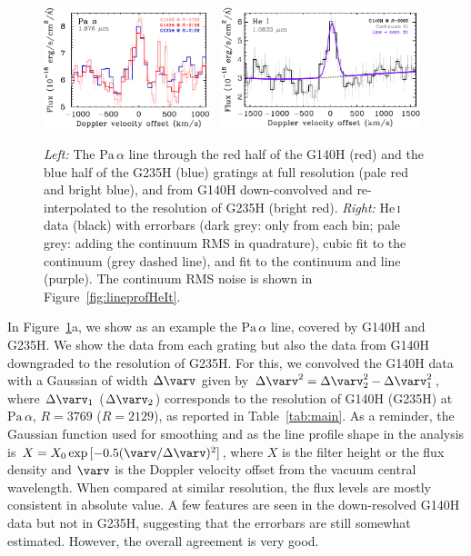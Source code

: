 \documentclass[twocolumn,twocolumnappendix]{aastex631}
\newcommand{\neuI}[1]{{\leavevmode{\boldmath\bfseries#1}}}
\renewcommand{\neuI}[1]{{\leavevmode#1}}
\def\Paa{\ensuremath{\mathrm{Pa}\,\alpha}\xspace}           %
\def\HeI{\ensuremath{\mathrm{He}}\,\textsc{i}\xspace}       %
\def\HeIt{\HeI}                     %
\def\Dv{\ensuremath{\Delta \varv}\xspace}
\begin{document}
\begin{figure}
 \centering
 \includegraphics[width=0.43\textwidth]{TWA27B_ULFLS_UeberlappPaa.pdf}~~\includegraphics[width=0.515\textwidth]{TWA27B_ULFLS_Vignette_HeIt.pdf}
\caption{%
\textit{Left:}
The \Paa line through the red half of the G140H (red) and the blue half of the G235H (blue) gratings at full resolution (pale red and bright blue), and from G140H down-convolved and re-interpolated to the resolution of G235H (bright red).
\textit{Right:}
\HeIt data (black) with errorbars (dark grey: only from each bin; pale grey: adding the continuum RMS in quadrature), cubic fit to the continuum (grey dashed line), and fit to the continuum and line (purple).
The continuum RMS noise is shown in Figure~\ref{fig:lineprofHeIt}.
%
}
\label{fig:Paa+HeIt}
\end{figure}



In Figure~\ref{fig:Paa+HeIt}a, we show as an example the \Paa line, covered by G140H and G235H.
We show the data from each grating but also the data from G140H %
downgraded to the resolution of G235H.
For this, we convolved the G140H data with a Gaussian of width \Dv given by $\Dv^2=\Dv_2^2-\Dv_1^2$,
where $\Dv_1$ ($\Dv_2$) corresponds to the resolution of G140H (G235H) at \Paa, $R=3769$ ($R=2129$), as reported in Table~\ref{tab:main}.
As a reminder, the Gaussian function used for smoothing and as the line profile shape in the analysis
is $X=X_0\exp{[-0.5(\varv/\Dv)^2]}$, where $X$ is the filter height or the flux density \neuI{and $\varv$ is the Doppler velocity offset from the vacuum central wavelength}.
When compared at similar resolution, the flux levels are mostly consistent in absolute value.
A few features are seen in the down-resolved G140H data but not in G235H, suggesting that the errorbars are still somewhat estimated. However, the overall agreement is very good.
\end{document}
